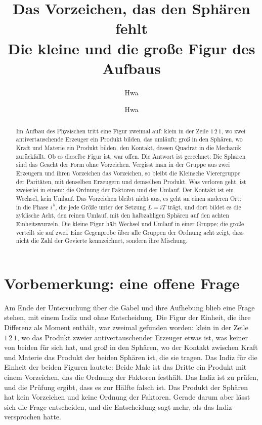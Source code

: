 \documentclass[11pt,a4paper]{article}
\title{Das Vorzeichen, das den Sphären fehlt\\[4pt]\large Die kleine und die große Figur des Aufbaus}
\author{Hwa}
\date{}
\author{Hwa}
\date{}
\begin{document}
\maketitle

\begin{abstract}
\noindent Im Aufbau des Physischen tritt eine Figur zweimal auf: klein in der Zeile $1\,2\,1$, wo zwei antivertauschende Erzeuger ein Produkt bilden, das umläuft; groß in den Sphären, wo Kraft und Materie ein Produkt bilden, den Kontakt, dessen Quadrat in die Mechanik zurückfällt. Ob es dieselbe Figur ist, war offen. Die Antwort ist gerechnet: Die Sphären sind das Geacht der Form ohne Vorzeichen. Vergisst man in der Gruppe aus zwei Erzeugern und ihren Vorzeichen das Vorzeichen, so bleibt die Kleinsche Vierergruppe der Paritäten, mit denselben Erzeugern und demselben Produkt. Was verloren geht, ist zweierlei in einem: die Ordnung der Faktoren und der Umlauf. Der Kontakt ist ein Wechsel, kein Umlauf. Das Vorzeichen bleibt nicht aus, es geht an einen anderen Ort: in die Phase $i^{\,b}$, die jede Größe unter der Setzung $L=iT$ trägt, und dort bildet es die zyklische Acht, den reinen Umlauf, mit den halbzahligen Sphären auf den achten Einheitswurzeln. Die kleine Figur hält Wechsel und Umlauf in einer Gruppe; die große verteilt sie auf zwei. Eine Gegenprobe über alle Gruppen der Ordnung acht zeigt, dass nicht die Zahl der Gevierte kennzeichnet, sondern ihre Mischung.
\end{abstract}

\tableofcontents
\bigskip

\section*{Vorbemerkung: eine offene Frage}

Am Ende der Untersuchung über die Gabel und ihre Aufhebung blieb eine Frage stehen, mit einem Indiz und ohne Entscheidung. Die Figur der Einheit, die ihre Differenz als Moment enthält, war zweimal gefunden worden: klein in der Zeile $1\,2\,1$, wo das Produkt zweier antivertauschender Erzeuger etwas ist, was keiner von beiden für sich hat, und groß in den Sphären, wo der Kontakt zwischen Kraft und Materie das Produkt der beiden Sphären ist, die sie tragen. Das Indiz für die Einheit der beiden Figuren lautete: Beide Male ist das Dritte ein Produkt mit einem Vorzeichen, das die Ordnung der Faktoren festhält. Das Indiz ist zu prüfen, und die Prüfung ergibt, dass es zur Hälfte falsch ist. Das Produkt der Sphären hat kein Vorzeichen und keine Ordnung der Faktoren. Gerade darum aber lässt sich die Frage entscheiden, und die Entscheidung sagt mehr, als das Indiz versprochen hatte.
\end{document}
